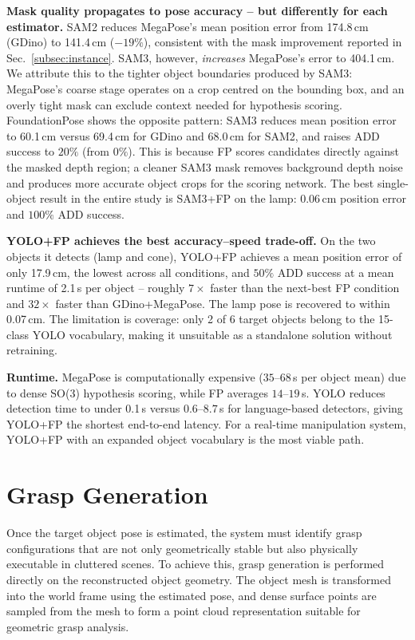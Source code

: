 \documentclass[conference,letterpaper,10pt]{IEEEtran}
\begin{document}
\textbf{Mask quality propagates to pose accuracy -- but differently for
each estimator.}
SAM2 reduces MegaPose's mean position error from 174.8\,cm (GDino) to
141.4\,cm ($-19\%$), consistent with the mask improvement reported in
Sec.~\ref{subsec:instance}. SAM3, however, \emph{increases} MegaPose's
error to 404.1\,cm. We attribute this to the tighter object boundaries
produced by SAM3: MegaPose's coarse stage operates on a crop centred on
the bounding box, and an overly tight mask can exclude context needed
for hypothesis scoring.
FoundationPose shows the opposite pattern: SAM3 reduces mean position
error to 60.1\,cm versus 69.4\,cm for GDino and 68.0\,cm for SAM2,
and raises ADD success to $20\%$ (from $0\%$). This is because FP
scores candidates directly against the masked depth region; a cleaner
SAM3 mask removes background depth noise and produces more accurate
object crops for the scoring network. The best single-object result in
the entire study is SAM3+FP on the lamp: $0.06$\,cm position error and
$100\%$ ADD success.

\textbf{YOLO+FP achieves the best accuracy--speed trade-off.}
On the two objects it detects (lamp and cone), YOLO+FP achieves a mean
position error of only 17.9\,cm, the lowest across all conditions, and
$50\%$ ADD success at a mean runtime of 2.1\,s per object -- roughly
$7\times$ faster than the next-best FP condition and $32\times$ faster
than GDino+MegaPose. The lamp pose is recovered to within 0.07\,cm.
The limitation is coverage: only 2 of 6 target objects belong to the
15-class YOLO vocabulary, making it unsuitable as a standalone
solution without retraining.

\textbf{Runtime.}
MegaPose is computationally expensive ($35$--$68$\,s per object mean)
due to dense SO(3) hypothesis scoring, while FP averages $14$--$19$\,s.
YOLO reduces detection time to under 0.1\,s versus $0.6$--$8.7$\,s for
language-based detectors, giving YOLO+FP the shortest end-to-end
latency. For a real-time manipulation system, YOLO+FP with an
expanded object vocabulary is the most viable path.

\section{Grasp Generation}

Once the target object pose is estimated, the system must identify grasp configurations that are not only geometrically stable but also physically executable in cluttered scenes. To achieve this, grasp generation is performed directly on the reconstructed object geometry. The object mesh is transformed into the world frame using the estimated pose, and dense surface points are sampled from the mesh to form a point cloud representation suitable for geometric grasp analysis.
\end{document}
